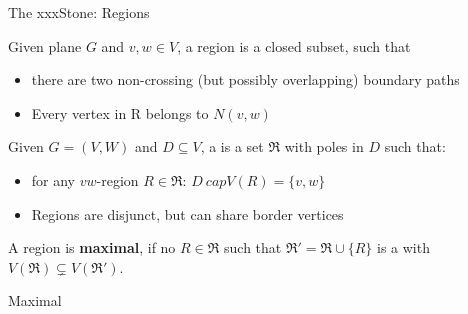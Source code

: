 \begin{frame}[c]{The xxxStone: Regions}

    \begin{tcolorbox}[colback=TUMBlueLighter,title=Region (Simplified)]
        Given plane $G$ and $v,w \in V$, a region is a closed subset, such that
    \begin{itemize}
        \item there are two non-crossing (but possibly overlapping) boundary paths
        \item Every vertex in R belongs to $N(v,w)$
    \end{itemize}
    \end{tcolorbox}

    \begin{figure}[!ht]
    \end{figure}
\end{frame}

\begin{frame}[c]{\dreg}
    \begin{tcolorbox}[colback=TUMBlueLighter,title={\dreg\cite{Alber2004}}]
        Given $G = (V, W)$ and $D \subseteq V$, a \dreg is a set $\mathfrak{R}$ with poles in $D$ such that:
        \begin{itemize}
            \item for any $vw$-region $R \in \mathfrak{R}$: $D \ cap V(R) = \{v, w\}$
            \item Regions are disjunct, but can share border vertices
        \end{itemize}
    \end{tcolorbox}
    A region is \textbf{maximal}, if no $R \in \mathfrak{R}$ such that $\mathfrak{R}' = \mathfrak{R} \cup \{R\}$ is a \dreg with $V(\mathfrak{R})\subsetneq V(\mathfrak{R}')$.
\end{frame}

\begin{frame}[c]{Maximal \dreg}
    \begin{figure}[!ht]
    \end{figure}
\end{frame}

